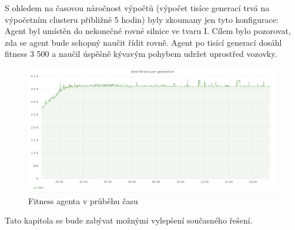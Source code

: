 S ohledem na časovou náročnost výpočtů (výpočet tisíce generací trvá na výpočetním clusteru přibližně 5 hodin) byly zkoumany jen tyto konfigurace:
Agent byl umístěn do nekonečné rovné silnice ve tvaru I. Cílem bylo pozorovat, zda se agent bude schopný naučit řídit rovně. Agent po tisící generací dosáhl fitness 3 500 a naučil úspěšně kývavým pohybem udržet uprostřed vozovky.
\begin{figure}[h]
	\centering
	\includegraphics[scale=0.4]{I_fitness}
	\caption{Fitness agenta v průběhu času}
	\label{fig:i-experiment}
\end{figure}

Tato kapitola se bude zabývat možnými vylepšení současného řešení.
